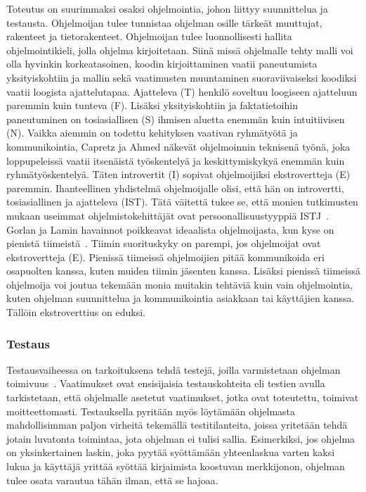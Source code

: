 \documentclass[finnish]{../tktltiki2}
\theoremstyle{definition}
\theoremstyle{remark}
\begin{document}
Toteutus on suurimmaksi osaksi ohjelmointia, johon liittyy suunnittelua ja testausta. Ohjelmoijan tulee tunnistaa ohjelman
osille tärkeät muuttujat, rakenteet ja tietorakenteet. Ohjelmoijan
tulee luonnollisesti hallita ohjelmointikieli, jolla ohjelma kirjoitetaan. Siinä missä ohjelmalle tehty malli voi olla hyvinkin korkeatasoinen, koodin kirjoittaminen vaatii paneutumista yksityiskohtiin ja mallin sekä vaatimusten muuntaminen suoraviivaiseksi koodiksi vaatii loogista ajattelutapaa. Ajatteleva (T)
henkilö soveltuu loogiseen ajatteluun paremmin kuin tunteva (F). Lisäksi yksityiskohtiin ja faktatietoihin paneutuminen on tosiasiallisen (S) ihmisen aluetta enemmän kuin intuitiivisen (N). Vaikka aiemmin on todettu kehityksen vaativan ryhmätyötä ja kommunikointia, Capretz ja Ahmed näkevät ohjelmoinnin teknisenä työnä, joka loppupeleissä vaatii itsenäistä työskentelyä ja keskittymiskykyä enemmän kuin ryhmätyöskentelyä. Täten introvertit (I) sopivat ohjelmoijiksi ekstrovertteja (E) paremmin. Ihanteellinen yhdistelmä ohjelmoijalle olisi, että hän on introvertti, tosiasiallinen ja ajatteleva (IST). Tätä väitettä tukee se, että monien tutkimusten mukaan useimmat ohjelmistokehittäjät ovat persoonallisuustyyppiä ISTJ~\cite{Capretz:2003:PTS:766407.766410,Capretz:2010:MSS:1726559.1726574}.\\

Gorlan ja Lamin havainnot poikkeavat ideaalista ohjelmoijasta, kun kyse on pienistä tiimeistä~\cite{Gorla:2004:WWB:990680.990684}. Tiimin suorituskyky on parempi, jos ohjelmoijat ovat ekstrovertteja (E). Pienissä tiimeissä ohjelmoijien pitää kommunikoida eri osapuolten kanssa, kuten muiden tiimin jäsenten kanssa. Lisäksi pienissä tiimeissä ohjelmoija voi joutua tekemään monia muitakin tehtäviä kuin vain ohjelmointia, kuten ohjelman suunnittelua ja kommunikointia asiakkaan tai käyttäjien kanssa. Tällöin ekstroverttius on eduksi.

\subsubsection{Testaus}

Testausvaiheessa on tarkoituksena tehdä testejä, joilla varmistetaan ohjelman toimivuus~\cite{SWEBOK:409902}. Vaatimukset ovat ensisijaisia
testauskohteita eli testien avulla tarkistetaan, että ohjelmalle asetetut vaatimukset, jotka ovat toteutettu, toimivat
moitteettomasti. Testauksella pyritään myös löytämään ohjelmasta mahdollisimman paljon virheitä tekemällä testitilanteita, joissa yritetään
tehdä jotain luvatonta toimintaa, jota ohjelman ei tulisi sallia. Esimerkiksi, jos ohjelma on yksinkertainen laskin,
joka pyytää syöttämään yhteenlaskua varten kaksi lukua ja käyttäjä yrittää syöttää kirjaimista koostuvan merkkijonon, ohjelman
tulee osata varautua tähän ilman, että se hajoaa.\\
\end{document}

